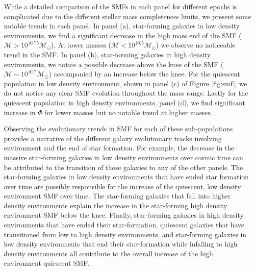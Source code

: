 \documentclass{emulateapj}
\begin{document}
While a detailed comparison of the SMFs in each panel for different
epochs is complicated due to the different stellar mass completeness limits, we present some notable trends in each panel. In panel (a), star-forming galaxies in low density environments, we find a significant decrease in the high mass end of the SMF ($\mathcal{M} > 10^{10.75} \mathcal{M}_{\odot}$). At lower masses ($\mathcal{M} < 10^{10.5} \mathcal{M}_{\odot}$) we observe no noticeable trend in the SMF. In panel (b), star-forming galaxies in high density environments, we notice a possible decrease above the knee of the SMF ($\mathcal{M} \sim 10^{10.7} \mathcal{M}_{\odot}$) accompanied by an increase below the knee. For the quiescent population in low density environment, shown in panel (c) of Figure \ref{fig:smf}, we do not notice any clear SMF evolution throughout the mass range. Lastly for the quiescent population in high density environments, panel (d), we find significant increase in $\Phi$ for lower masses but no notable trend at higher masses. 


Observing the evolutionary trends in SMF for each of these
sub-populations provides a narrative of the different galaxy
evolutionary tracks involving environment and the end of star
formation. For example, the decrease in the massive star-forming
galaxies in low density environments over cosmic time can be
attributed to the transition of those galaxies to any of the other
panels. The star-forming galaxies in low density environments that
have ended star formation over time are possibly responsible
for the increase of the quiescent, low density environment SMF over
time. The star-forming galaxies that fall into higher density
environments explain the increase in the star-forming high density
environment SMF below the knee. Finally, star-forming galaxies in high
density environments that have ended their star-formation,
quiescent galaxies that have transitioned from low to high density
environments, and star-forming galaxies in low density environments
that end their star-formation while infalling to high density
environments all contribute to the overall increase of the high
environment quiescent SMF.
\end{document}
